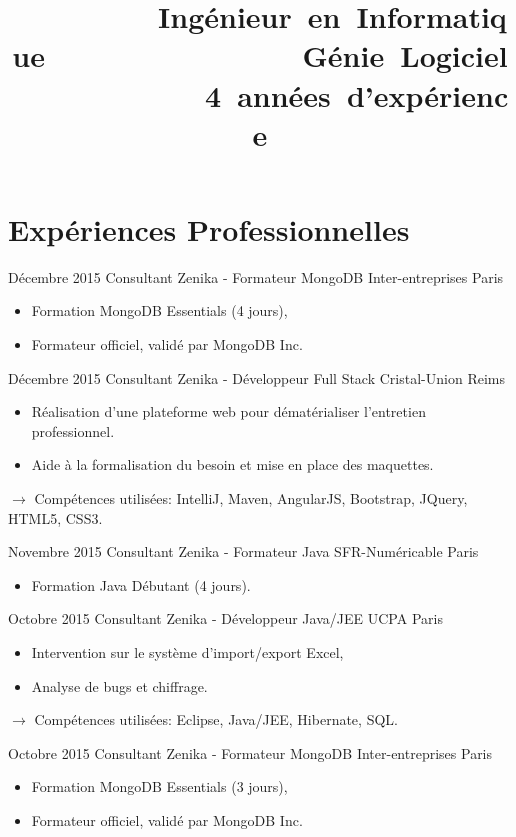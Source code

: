\documentclass[11pt,a4paper]{moderncv}
\title{\mbox{~~~~~~~~~Ingénieur en Informatique}\newline\mbox{~~~~~~~~~~~~~~~~Génie Logiciel}\newline\mbox{~~~~~~~~~~~~4 années d'expérience}} %
\begin{document}
\maketitle

\section{Expériences Professionnelles}

\cventry
{Décembre 2015}
{Consultant Zenika - Formateur MongoDB}
{Inter-entreprises}
{Paris}
{}
{\begin{itemize}
\item Formation MongoDB Essentials (4 jours),
\item Formateur officiel, validé par MongoDB Inc.
\end{itemize}
}   %

\cventry
{Décembre 2015}
{Consultant Zenika - Développeur Full Stack}
{Cristal-Union}
{Reims}
{}
{\begin{itemize}
\item Réalisation d'une plateforme web pour dématérialiser l'entretien professionnel.
\item Aide à la formalisation du besoin et mise en place des maquettes.
\end{itemize}
$\rightarrow$ Compétences utilisées: IntelliJ, Maven, AngularJS, Bootstrap, JQuery, HTML5, CSS3.
}   %

\cventry
{Novembre 2015}
{Consultant Zenika - Formateur Java}
{SFR-Numéricable}
{Paris}
{}
{\begin{itemize}
\item Formation Java Débutant (4 jours).
\end{itemize}
}   %

\cventry
{Octobre 2015}
{Consultant Zenika - Développeur Java/JEE}
{UCPA}
{Paris}
{}
{\begin{itemize}
\item Intervention sur le système d'import/export Excel, 
\item Analyse de bugs et chiffrage.
\end{itemize}
$\rightarrow$ Compétences utilisées: Eclipse, Java/JEE, Hibernate, SQL.
}   %

\cventry
{Octobre 2015}
{Consultant Zenika - Formateur MongoDB}
{Inter-entreprises}
{Paris}
{}
{\begin{itemize}
\item Formation MongoDB Essentials (3 jours),
\item Formateur officiel, validé par MongoDB Inc.
\end{itemize}
}   %
\end{document}
